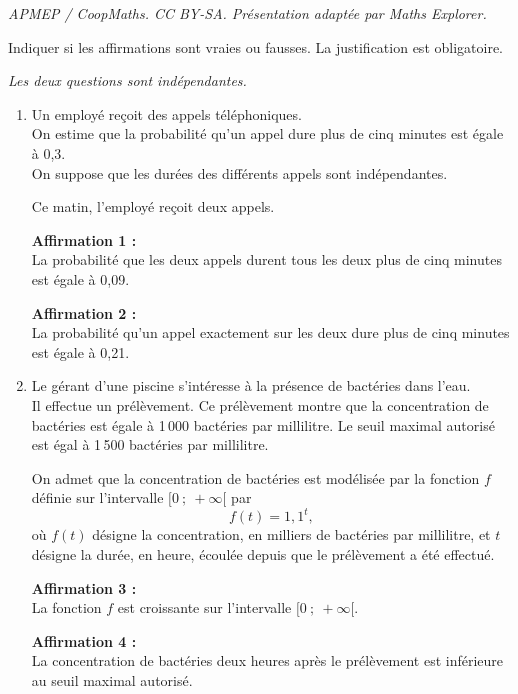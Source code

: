 \documentclass[10pt]{article}
\begin{document}
\noindent\textit{APMEP / CoopMaths. CC BY-SA. Présentation adaptée par Maths Explorer.}\par\medskip
Indiquer si les affirmations sont vraies ou fausses. La justification est obligatoire.

\centering \textit{Les deux questions sont indépendantes.}

\begin{enumerate}
\item Un employé reçoit des appels téléphoniques. \\
On estime que la probabilité qu'un appel dure plus de cinq minutes est égale à 0,3. \\
On suppose que les durées des différents appels sont indépendantes.

Ce matin, l'employé reçoit deux appels.

\textbf{Affirmation 1 :} \\
La probabilité que les deux appels durent tous les deux plus de cinq minutes est égale à 0,09.

\textbf{Affirmation 2 :} \\
La probabilité qu'un appel exactement sur les deux dure plus de cinq minutes est égale à 0,21.

\bigskip

\item Le gérant d'une piscine s'intéresse à la présence de bactéries dans l'eau. \\
Il effectue un prélèvement. Ce prélèvement montre que la concentration de bactéries est égale à 1\,000 bactéries par millilitre. Le seuil maximal autorisé est égal à 1\,500 bactéries par millilitre.

On admet que la concentration de bactéries est modélisée par la fonction $f$ définie sur l'intervalle $[0~;~+\infty[$ par
\[ f(t) = 1,1^t, \]
où $f(t)$ désigne la concentration, en milliers de bactéries par millilitre, et $t$ désigne la durée, en heure, écoulée depuis que le prélèvement a été effectué.

\textbf{Affirmation 3 :} \\
La fonction $f$ est croissante sur l'intervalle $[0~;~+\infty[$.

\textbf{Affirmation 4 :} \\
La concentration de bactéries deux heures après le prélèvement est inférieure au seuil maximal autorisé.
\end{enumerate}
\end{document}
